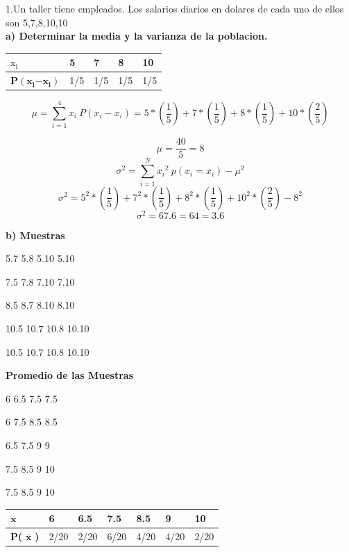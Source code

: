 \documentclass[10pt,a4paper]{article}
\begin{document}
\newpage
\begin{flushleft}

1.Un taller tiene empleados. Los salarios diarios en dolares de cada uno de ellos son 5,7,8,10,10\\
\textbf{a) Determinar la media y la varianza de la poblacion.}

\begin{tabular}{|p{0.8in}|p{0.8in}|p{0.8in}|p{0.8in}|p{0.8in}|} \hline 
	${\boldsymbol{\mathrm{x}}}_{\boldsymbol{\mathrm{i}}}$\textbf{} & 5 & 7 & 8 & 10 \\ \hline 
	$\boldsymbol{P}\left({\boldsymbol{x}}_{\boldsymbol{i}}\boldsymbol{-}{\boldsymbol{x}}_{\boldsymbol{i}}\right)$\textbf{} & 1/5 & 1/5 & 1/5 & 1/5 \\ \hline 
\end{tabular}


\[\mu =\sum^4_{i=1}{x_i}\ P\left(x_i-x_i\right)=5*\left(\frac{1}{5}\right)+7*\left(\frac{1}{5}\right)+8*\left(\frac{1}{5}\right)+10*\left(\frac{2}{5}\right)\] 


\[\mu =\frac{40}{5}=8\] 
\[{\sigma }^2=\sum^N_{i=1}{{x_i}^2}\ p\left(x_i=x_i\right)-{\mu }^2\] 
\[{\sigma }^2=5^2*\left(\frac{1}{5}\right)+7^2*\left(\frac{1}{5}\right)+8^2*\left(\frac{1}{5}\right)+{10}^2*\left(\frac{2}{5}\right)-8^2\] 
\[{\sigma }^2=67.6=64=3.6\] 


\noindent \textbf{b) Muestras}

5.7   5.8   5.10   5.10

7.5     7.8   7.10   7.10

8.5   8.7   8.10   8.10

10.5   10.7   10.8   10.10

10.5   10.7   10.8   10.10

\noindent \textbf{Promedio de las Muestras}

6     6.5   7.5   7.5

6    7.5   8.5   8.5

6.5   7.5   9  9

7.5   8.5  9 10

7.5   8.5  9   10

\noindent \eject 

\begin{tabular}{|p{0.6in}|p{0.6in}|p{0.6in}|p{0.6in}|p{0.6in}|p{0.6in}|p{0.6in}|} \hline 
	$\overline{\boldsymbol{x}}$\textbf{} & 6 & 6.5 & 7.5 & 8.5 & 9 & 10 \\ \hline 
	\textbf{P( }$\overline{\boldsymbol{x}}$\textbf{ )} & 2/20 & 2/20 & 6/20 & 4/20 & 4/20 & 2/20 \\ \hline 
\end{tabular}




\end{flushleft}
\end{document}
